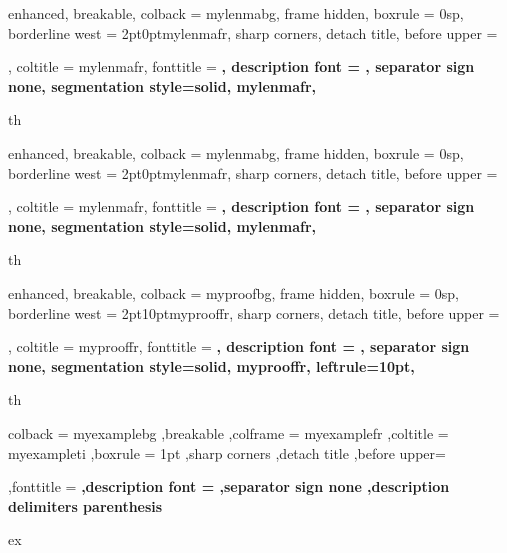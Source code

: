 {%
	enhanced,
	breakable,
	colback = mylenmabg,
	frame hidden,
	boxrule = 0sp,
	borderline west = {2pt}{0pt}{mylenmafr},
	sharp corners,
	detach title,
	before upper = \tcbtitle\par\smallskip,
	coltitle = mylenmafr,
	fonttitle = \bfseries\sffamily,
	description font = \mdseries,
	separator sign none,
	segmentation style={solid, mylenmafr},
}
{th}

{%
	enhanced,
	breakable,
	colback = mylenmabg,
	frame hidden,
	boxrule = 0sp,
	borderline west = {2pt}{0pt}{mylenmafr},
	sharp corners,
	detach title,
	before upper = \tcbtitle\par\smallskip,
	coltitle = mylenmafr,
	fonttitle = \bfseries\sffamily,
	description font = \mdseries,
	separator sign none,
	segmentation style={solid, mylenmafr},
}
{th}



{%
	enhanced,
	breakable,
	colback = myproofbg,
	frame hidden,
	boxrule = 0sp,
	borderline west = {2pt}{10pt}{myprooffr},
	sharp corners,
	detach title,
	before upper = \tcbtitle\par\smallskip,
	coltitle = myprooffr,
	fonttitle = \bfseries\sffamily,
	description font = \mdseries,
	separator sign none,
	segmentation style={solid, myprooffr},
	leftrule=10pt,
}
{th}

\renewenvironment{proof}[1][\proofname]{\vspace{-12pt}\begin{replacementproof}{#1}{}}{\end{replacementproof}}

{%
	colback = myexamplebg
	,breakable
	,colframe = myexamplefr
	,coltitle = myexampleti
	,boxrule = 1pt
	,sharp corners
	,detach title
	,before upper=\tcbtitle\par\smallskip
	,fonttitle = \bfseries
	,description font = \mdseries
	,separator sign none
	,description delimiters parenthesis
}
{ex}